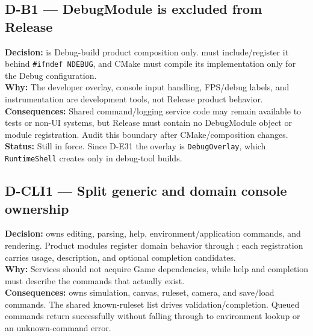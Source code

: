 \subsection*{D-B1 --- DebugModule is excluded from Release}
\begin{decisionbox}[title={D-B1 \quad 2026-08-04}]
\textbf{Decision:}  is Debug-build product composition
only.  must include/register it behind
\texttt{\#ifndef NDEBUG}, and CMake must compile its implementation only for the
Debug configuration.\\
\textbf{Why:} The developer overlay, console input handling, FPS/debug labels,
and instrumentation are development tools, not Release product behavior.\\
\textbf{Consequences:} Shared command/logging service code may remain available
to tests or non-UI systems, but Release must contain no DebugModule object or
module registration. Audit this boundary after CMake/composition changes.\\
\textbf{Status:} Still in force. Since D-E31 the overlay is
\texttt{DebugOverlay}, which \texttt{RuntimeShell} creates only in debug-tool
builds.
\end{decisionbox}

\subsection*{D-CLI1 --- Split generic and domain console ownership}
\begin{decisionbox}[title={D-CLI1 \quad 2026-08-04}]
\textbf{Decision:}  owns editing, parsing, help,
environment/application commands, and rendering. Product modules register
domain behavior through ; each registration carries
usage, description, and optional completion candidates.\\
\textbf{Why:} Services should not acquire Game dependencies, while help and
completion must describe the commands that actually exist.\\
\textbf{Consequences:}  owns simulation, canvas,
ruleset, camera, and save/load commands. The shared known-ruleset list drives
validation/completion. Queued commands return successfully without falling
through to environment lookup or an unknown-command error.
\end{decisionbox}

